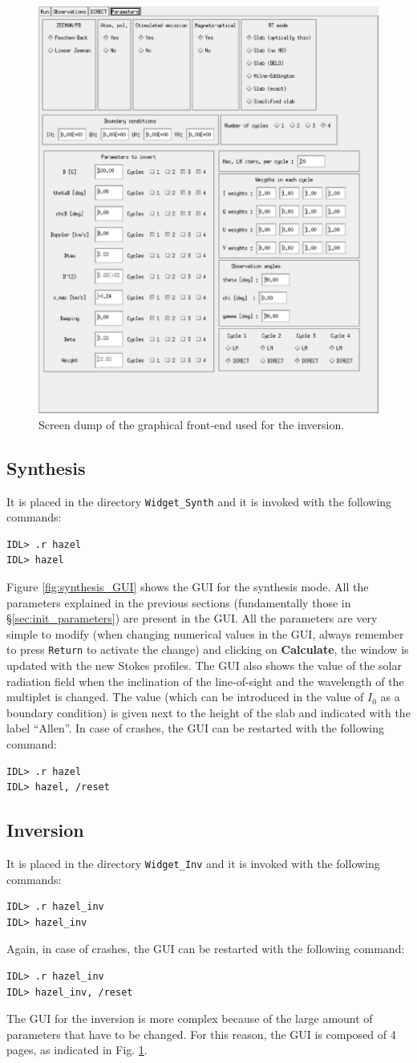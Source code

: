 \documentclass[12pt]{article}
\begin{document}
\begin{figure}[!t]
\hspace{0.5cm}
\includegraphics[width=0.48\columnwidth]{inv4.eps}
\caption{Screen dump of the graphical front-end used for the inversion.
\label{fig:inversion_GUI}}
\end{figure}


\subsection{Synthesis}
It is placed in the directory \texttt{Widget\_Synth} and it is invoked with the following commands:
\begin{verbatim}
IDL> .r hazel
IDL> hazel 
\end{verbatim}
Figure \ref{fig:synthesis_GUI} shows the GUI for the synthesis mode. All the parameters explained in
the previous sections (fundamentally those in \S\ref{sec:init_parameters}) are present in the
GUI. All the parameters are very simple to modify (when changing numerical values in the
GUI, always remember to press \texttt{Return} to activate the change) and clicking on \textbf{Calculate},
the window is updated with the new Stokes profiles.
The GUI also shows the value of the solar radiation field when the inclination of the line-of-sight
and the wavelength of the multiplet is changed. The value (which can be introduced in the
value of $I_0$ as a boundary condition) is given next to the height of the slab and
indicated with the label ``Allen''. In case of crashes, the GUI can be restarted with the following
command:
\begin{verbatim}
IDL> .r hazel
IDL> hazel, /reset
\end{verbatim}

\subsection{Inversion}
It is placed in the directory \texttt{Widget\_Inv} and it is invoked with the following commands:
\begin{verbatim}
IDL> .r hazel_inv
IDL> hazel_inv
\end{verbatim}
Again, in case of crashes, the GUI can be restarted with the following command:
\begin{verbatim}
IDL> .r hazel_inv
IDL> hazel_inv, /reset
\end{verbatim}
The GUI for the inversion is more complex because of the large amount of parameters that have
to be changed. For this reason, the GUI is composed of 4 pages, as indicated in 
Fig. \ref{fig:inversion_GUI}. 
\end{document}
